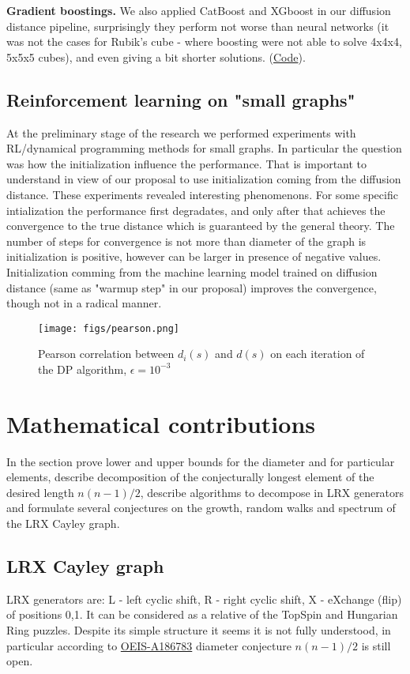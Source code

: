 \documentclass[atmp]{ipart_v1}
\numberwithin{equation}{section}
\theoremstyle{plain}%
\begin{document}
{\bf Gradient boostings.} We also applied CatBoost and XGboost in our diffusion distance pipeline, surprisingly they perform not worse than neural networks (it was not the cases for Rubik's cube - where boosting were not able to solve 4x4x4, 5x5x5 cubes), and even giving a bit shorter solutions. 
(\href{https://www.kaggle.com/code/antoninadolgorukova/lrx-gbm-powered-pathfinding}{Code}).

\subsection{Reinforcement learning on "small graphs"}
At the preliminary stage of the research we performed experiments with RL/dynamical programming methods for small graphs. In particular the question was how the initialization influence the performance. That is important to understand in view of our proposal to use initialization coming from the diffusion distance.
These experiments revealed interesting phenomenons. 
For some specific intialization the performance first degradates, and only after that achieves the convergence to the true distance which is guaranteed by the general theory. The number of steps for convergence is not more than diameter of the graph is initialization is positive, however can be larger in presence of negative values. Initialization comming from the machine learning model trained on diffusion distance (same as "warmup step" in our proposal) improves the convergence, though not in a radical manner. 

\begin{figure}[h]
    \centering
    \texttt{[image: figs/pearson.png]}
    \caption{Pearson correlation between $d_i(s)$ and $d(s)$ on each iteration of the DP algorithm, $\epsilon = 10^{-3}$}\label{fig:pearson}
\end{figure}

\section{Mathematical contributions}
In the section prove lower and upper bounds for the diameter and for particular elements, describe decomposition of the conjecturally longest element of the desired length $n(n-1)/2$, describe algorithms to decompose in LRX generators and formulate several conjectures on the growth, random walks and spectrum of the LRX Cayley graph. 

\subsection{LRX Cayley graph}
LRX generators are:  L - left cyclic shift, R - right cyclic shift, X - eXchange (flip) of positions 0,1. It can be considered as a relative of the TopSpin and Hungarian Ring puzzles. Despite its simple structure it seems it is not fully understood, in particular according to \href{https://oeis.org/A186783}{OEIS-A186783} diameter conjecture $n(n-1)/2$ is still open. 
\end{document}

